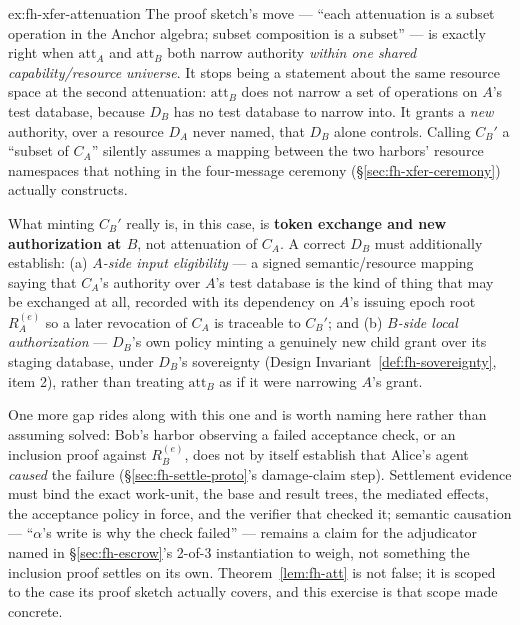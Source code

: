 \documentclass[11pt,a4paper]{article}
\theoremstyle{definition}
\theoremstyle{remark}
\begin{document}
\begin{pdsolution}{ex:fh-xfer-attenuation}
The proof sketch's move --- ``each attenuation is a subset operation in the Anchor algebra; subset composition is a subset'' --- is exactly right when $\mathrm{att}_A$ and $\mathrm{att}_B$ both narrow authority \emph{within one shared capability/resource universe}. It stops being a statement about the same resource space at the second attenuation: $\mathrm{att}_B$ does not narrow a set of operations on $A$'s test database, because $D_B$ has no test database to narrow into. It grants a \emph{new} authority, over a resource $D_A$ never named, that $D_B$ alone controls. Calling $C_B'$ a ``subset of $C_A$'' silently assumes a mapping between the two harbors' resource namespaces that nothing in the four-message ceremony (\S\ref{sec:fh-xfer-ceremony}) actually constructs.

What minting $C_B'$ really is, in this case, is \textbf{token exchange and new authorization at $B$}, not attenuation of $C_A$. A correct $D_B$ must additionally establish: (a) \emph{$A$-side input eligibility} --- a signed semantic/resource mapping saying that $C_A$'s authority over $A$'s test database is the kind of thing that may be exchanged at all, recorded with its dependency on $A$'s issuing epoch root $R_A^{(e)}$ so a later revocation of $C_A$ is traceable to $C_B'$; and (b) \emph{$B$-side local authorization} --- $D_B$'s own policy minting a genuinely new child grant over its staging database, under $D_B$'s sovereignty (Design Invariant~\ref{def:fh-sovereignty}, item 2), rather than treating $\mathrm{att}_B$ as if it were narrowing $A$'s grant.

One more gap rides along with this one and is worth naming here rather than assuming solved: Bob's harbor observing a failed acceptance check, or an inclusion proof against $R_B^{(e)}$, does not by itself establish that Alice's agent \emph{caused} the failure (\S\ref{sec:fh-settle-proto}'s damage-claim step). Settlement evidence must bind the exact work-unit, the base and result trees, the mediated effects, the acceptance policy in force, and the verifier that checked it; semantic causation --- ``$\alpha$'s write is why the check failed'' --- remains a claim for the adjudicator named in \S\ref{sec:fh-escrow}'s 2-of-3 instantiation to weigh, not something the inclusion proof settles on its own. Theorem~\ref{lem:fh-att} is not false; it is scoped to the case its proof sketch actually covers, and this exercise is that scope made concrete.
\end{pdsolution}
\end{document}
